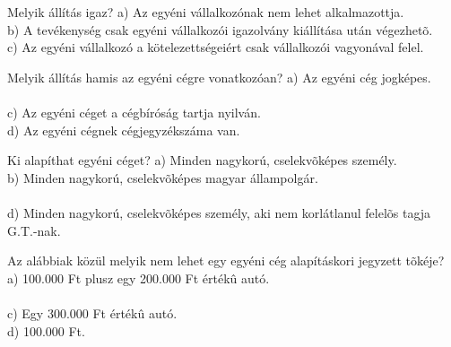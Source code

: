 \begin{frame}

\begin{tcolorbox}[title={87. Kérdés}]
Melyik állítás igaz?
\tcblower
a) Az egyéni vállalkozónak nem lehet alkalmazottja.\\
b) A tevékenység csak egyéni vállalkozói igazolvány kiállítása után végezhetõ.\\
c) Az egyéni vállalkozó a kötelezettségeiért csak vállalkozói vagyonával felel. \\
\end{tcolorbox}

\begin{tcolorbox}[title={88. Kérdés}]
Melyik állítás hamis az egyéni cégre vonatkozóan?
\tcblower
a) Az egyéni cég jogképes.\\
\\
c) Az egyéni céget a cégbíróság tartja nyilván.\\
d) Az egyéni cégnek cégjegyzékszáma van.
\end{tcolorbox}

\begin{tcolorbox}[title={89. Kérdés}]
Ki alapíthat egyéni céget?
\tcblower
a) Minden nagykorú, cselekvõképes személy.\\
b) Minden nagykorú, cselekvõképes magyar állampolgár.\\
\\
d) Minden nagykorú, cselekvõképes személy, aki nem korlátlanul felelõs tagja G.T.-nak.
\end{tcolorbox}

\begin{tcolorbox}[title={90. Kérdés}]
Az alábbiak közül melyik nem lehet egy egyéni cég alapításkori jegyzett tõkéje?
\tcblower
a) 100.000 Ft plusz egy 200.000 Ft értékû autó.\\
\\
c) Egy 300.000 Ft értékû autó. \\
d) 100.000 Ft.
\end{tcolorbox}

\end{frame}


